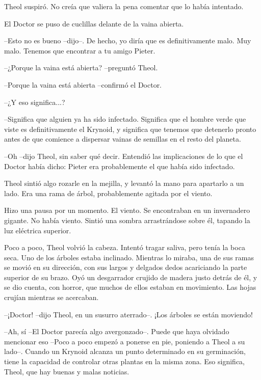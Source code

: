 Theol suspiró. No creía que valiera la pena comentar que lo había intentado.



El Doctor se puso de cuclillas delante de la vaina abierta.

--Esto no es bueno --dijo--. De hecho, yo diría que es definitivamente malo. Muy malo. Tenemos que encontrar a tu amigo Pieter.



--¿Porque la vaina está abierta? --preguntó Theol.



--Porque la vaina está abierta --confirmó el Doctor.



--¿Y eso significa...?



--Significa que alguien ya ha sido infectado. Significa que el hombre verde que viste es definitivamente el Krynoid, y significa que tenemos que detenerlo pronto antes de que comience a dispersar vainas de semillas en el resto del planeta.



--Oh --dijo Theol, sin saber qué decir. Entendió las implicaciones de lo que el Doctor había dicho: Pieter era probablemente el que había sido infectado.



Theol sintió algo rozarle en la mejilla, y levantó la mano para apartarlo a un lado. Era una rama de árbol, probablemente agitada por el viento.



Hizo una pausa por un momento. El viento. Se encontraban en un invernadero gigante. No había viento. Sintió una sombra arrastrándose sobre él, tapando la luz eléctrica superior.



Poco a poco, Theol volvió la cabeza. Intentó tragar saliva, pero tenía la boca seca. Uno de los árboles estaba inclinado. Mientras lo miraba, una de sus ramas se movió en su dirección, con sus largos y delgados dedos acariciando la parte superior de su brazo. Oyó un desgarrador crujido de madera justo detrás de él, y se dio cuenta, con horror, que muchos de ellos estaban en movimiento. Las hojas crujían mientras se acercaban.



--¡Doctor! --dijo Theol, en un susurro aterrado--. ¡Los árboles se están moviendo!



--Ah, sí --El Doctor parecía algo avergonzado--. Puede que haya olvidado mencionar eso --Poco a poco empezó a ponerse en pie, poniendo a Theol a su lado--. Cuando un Krynoid alcanza un punto determinado en su germinación, tiene la capacidad de controlar otras plantas en la misma zona. Eso significa, Theol, que hay buenas y malas noticias.




